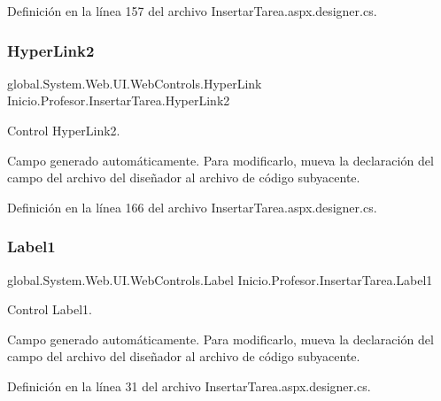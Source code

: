 Definición en la línea 157 del archivo Insertar\+Tarea.\+aspx.\+designer.\+cs.

\mbox{\label{classInicio_1_1Profesor_1_1InsertarTarea_a78889f34c68a38f5de7209c6377b5772}} 
\subsubsection{\texorpdfstring{HyperLink2}{HyperLink2}}
{\footnotesize\ttfamily global.\+System.\+Web.\+U\+I.\+Web\+Controls.\+Hyper\+Link Inicio.\+Profesor.\+Insertar\+Tarea.\+Hyper\+Link2\hspace{0.3cm}{\ttfamily [protected]}}



Control Hyper\+Link2. 

Campo generado automáticamente. Para modificarlo, mueva la declaración del campo del archivo del diseñador al archivo de código subyacente. 

Definición en la línea 166 del archivo Insertar\+Tarea.\+aspx.\+designer.\+cs.

\mbox{\label{classInicio_1_1Profesor_1_1InsertarTarea_a7d69f2949d25d39cbad11ad28497b5f1}} 
\subsubsection{\texorpdfstring{Label1}{Label1}}
{\footnotesize\ttfamily global.\+System.\+Web.\+U\+I.\+Web\+Controls.\+Label Inicio.\+Profesor.\+Insertar\+Tarea.\+Label1\hspace{0.3cm}{\ttfamily [protected]}}



Control Label1. 

Campo generado automáticamente. Para modificarlo, mueva la declaración del campo del archivo del diseñador al archivo de código subyacente. 

Definición en la línea 31 del archivo Insertar\+Tarea.\+aspx.\+designer.\+cs.

\mbox{\label{classInicio_1_1Profesor_1_1InsertarTarea_ac457501cc0a165ec67a5474e2581a8b5}} 

